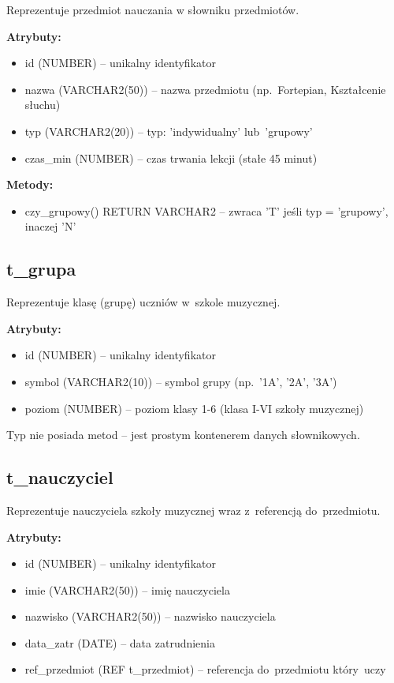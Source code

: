 \documentclass[12pt,a4paper]{article}
\begin{document}
Reprezentuje przedmiot nauczania w słowniku przedmiotów.

\textbf{Atrybuty:}
\begin{itemize}[nosep]
    \item id (NUMBER) -- unikalny identyfikator
    \item nazwa (VARCHAR2(50)) -- nazwa przedmiotu (np.~Fortepian, Kształcenie słuchu)
    \item typ (VARCHAR2(20)) -- typ: 'indywidualny' lub~'grupowy'
    \item czas\_min (NUMBER) -- czas trwania lekcji (stałe 45 minut)
\end{itemize}

\textbf{Metody:}
\begin{itemize}[nosep]
    \item czy\_grupowy() RETURN VARCHAR2 -- zwraca 'T' jeśli typ = 'grupowy', inaczej 'N'
\end{itemize}

\subsection{t\_grupa}

Reprezentuje klasę (grupę) uczniów w~szkole muzycznej.

\textbf{Atrybuty:}
\begin{itemize}[nosep]
    \item id (NUMBER) -- unikalny identyfikator
    \item symbol (VARCHAR2(10)) -- symbol grupy (np.~'1A', '2A', '3A')
    \item poziom (NUMBER) -- poziom klasy 1-6 (klasa I-VI szkoły muzycznej)
\end{itemize}

Typ nie posiada metod -- jest prostym kontenerem danych słownikowych.

\subsection{t\_nauczyciel}

Reprezentuje nauczyciela szkoły muzycznej wraz z~referencją do~przedmiotu.

\textbf{Atrybuty:}
\begin{itemize}[nosep]
    \item id (NUMBER) -- unikalny identyfikator
    \item imie (VARCHAR2(50)) -- imię nauczyciela
    \item nazwisko (VARCHAR2(50)) -- nazwisko nauczyciela
    \item data\_zatr (DATE) -- data zatrudnienia
    \item ref\_przedmiot (REF t\_przedmiot) -- referencja do~przedmiotu który~uczy
\end{itemize}
\end{document}
